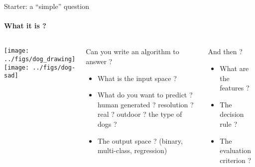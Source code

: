 \begin{frame}{Starter: a ``simple'' question}
  \framesubtitle{What it is ?}
    \begin{columns}
      \begin{center}
        \texttt{[image: ../figs/dog\_drawing]}
        \\[3ex]\pause
        \texttt{[image: ../figs/dog-sad]}\pause
      \end{center}

      \begin{block}{Can you write an algorithm to answer ?}
        \pause
        \begin{itemize}
        \item What is the input space ? 
        \item What do you want to predict ? \\  human generated ? resolution ? 
          real ? outdoor ? the type of dogs ?
        \item The output space ? (binary, multi-class, regression)
        \end{itemize}
      \end{block}
      \begin{block}{And then ?}
        \pause
        \begin{itemize}
        \item What are the features ? 
        \item The decision rule ? 
        \item The evaluation criterion ? 
        \end{itemize}
      \end{block}
    \end{columns}
  \end{frame}

